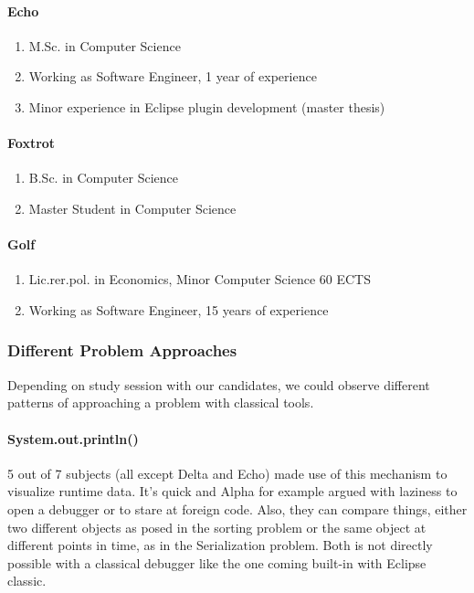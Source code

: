 \documentclass[english]{acm_proc_article-sp}
\begin{document}
\paragraph{Echo} %
\begin{enumerate}[$-$]
\item M.Sc. in Computer Science
\item Working as Software Engineer, 1 year of experience
\item Minor experience in Eclipse plugin development (master thesis)
\end{enumerate}

\paragraph{Foxtrot} %
\begin{enumerate}[$-$]
\item B.Sc. in Computer Science
\item Master Student  in Computer Science
\end{enumerate}

\paragraph{Golf} %
\begin{enumerate}[$-$]
\item Lic.rer.pol. in Economics, Minor Computer Science 60 ECTS
\item Working as Software Engineer, 15 years of experience
\end{enumerate}

\subsubsection{Different Problem Approaches}
Depending on study session with our candidates, we could observe different patterns of approaching a problem with classical tools.
\paragraph{System.out.println()}
5 out of 7 subjects (all except Delta and Echo) made use of this mechanism to visualize runtime data. It's quick and Alpha for example argued with laziness to open a debugger or to stare at foreign code. Also, they can compare things, either two different objects as posed in the sorting problem or the same object at different points in time, as in the Serialization problem. Both is not directly possible with a classical debugger like the one coming built-in with Eclipse classic.
\end{document}

